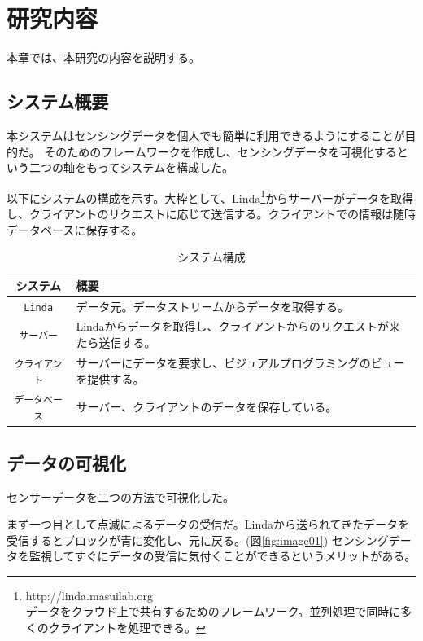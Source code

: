 \chapter{研究内容}
\label{chap:contents}

本章では、本研究の内容を説明する。

\section{システム概要}

本システムはセンシングデータを個人でも簡単に利用できるようにすることが目的だ。
そのためのフレームワークを作成し、センシングデータを可視化するという二つの軸をもってシステムを構成した。

以下にシステムの構成を示す。大枠として、Linda\footnote{http://linda.masuilab.org\\データをクラウド上で共有するためのフレームワーク。並列処理で同時に多くのクライアントを処理できる。}からサーバーがデータを取得し、クライアントのリクエストに応じて送信する。クライアントでの情報は随時データベースに保存する。

\begin{table}[htbp]
  \caption{システム構成}
  \label{tb:files}
  \begin{center}\begin{tabular}{c|l}
    \hline
    システム&概要\\\hline\hline
    {\tt Linda}&データ元。データストリームからデータを取得する。\\\hline
    {\tt サーバー}&Lindaからデータを取得し、クライアントからのリクエストが来たら送信する。\\\hline
    {\tt クライアント}&サーバーにデータを要求し、ビジュアルプログラミングのビューを提供する。\\\hline
    {\tt データベース}&サーバー、クライアントのデータを保存している。\\\hline
  \end{tabular}\end{center}
\end{table}

\section{データの可視化}
センサーデータを二つの方法で可視化した。

まず一つ目として点滅によるデータの受信だ。Lindaから送られてきたデータを受信するとブロックが青に変化し、元に戻る。(図\ref{fig:image01})
センシングデータを監視してすぐにデータの受信に気付くことができるというメリットがある。\\


